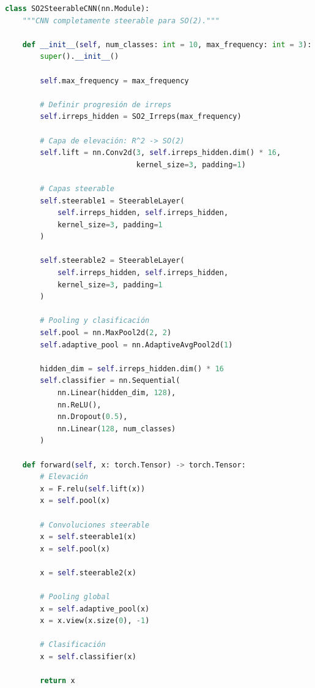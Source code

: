 \begin{listing}[h]
\begin{lstlisting}[language=Python]
class SO2SteerableCNN(nn.Module):
    """CNN completamente steerable para SO(2)."""
    
    def __init__(self, num_classes: int = 10, max_frequency: int = 3):
        super().__init__()
        
        self.max_frequency = max_frequency
        
        # Definir progresión de irreps
        self.irreps_hidden = SO2_Irreps(max_frequency)
        
        # Capa de elevación: R^2 -> SO(2)
        self.lift = nn.Conv2d(3, self.irreps_hidden.dim() * 16, 
                              kernel_size=3, padding=1)
        
        # Capas steerable
        self.steerable1 = SteerableLayer(
            self.irreps_hidden, self.irreps_hidden,
            kernel_size=3, padding=1
        )
        
        self.steerable2 = SteerableLayer(
            self.irreps_hidden, self.irreps_hidden,
            kernel_size=3, padding=1  
        )
        
        # Pooling y clasificación
        self.pool = nn.MaxPool2d(2, 2)
        self.adaptive_pool = nn.AdaptiveAvgPool2d(1)
        
        hidden_dim = self.irreps_hidden.dim() * 16
        self.classifier = nn.Sequential(
            nn.Linear(hidden_dim, 128),
            nn.ReLU(),
            nn.Dropout(0.5),
            nn.Linear(128, num_classes)
        )
    
    def forward(self, x: torch.Tensor) -> torch.Tensor:
        # Elevación
        x = F.relu(self.lift(x))
        x = self.pool(x)
        
        # Convoluciones steerable
        x = self.steerable1(x)
        x = self.pool(x)
        
        x = self.steerable2(x)
        
        # Pooling global
        x = self.adaptive_pool(x)
        x = x.view(x.size(0), -1)
        
        # Clasificación
        x = self.classifier(x)
        
        return x
\end{lstlisting}
\caption{Arquitectura completa SO(2) Steerable CNN}
\label{code:so2_steerable_cnn}
\end{listing}

